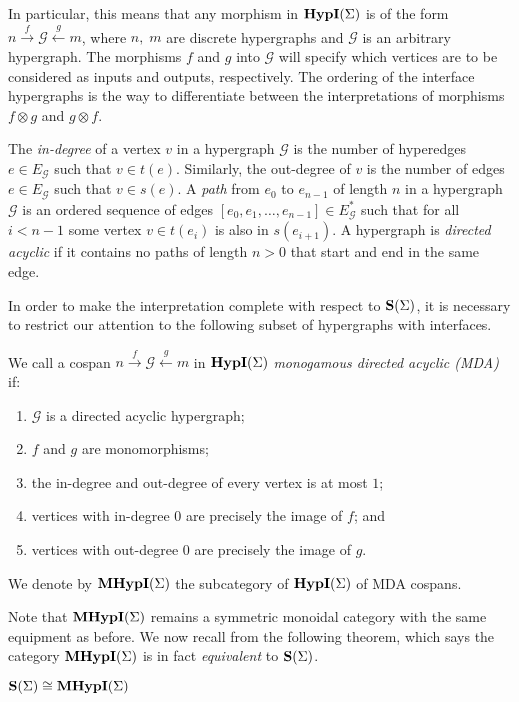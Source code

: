 In particular, this means that any morphism in $\textbf{HypI}(\Sigma)$ is of the form $n \xrightarrow{f} \mathcal{G} \xleftarrow{g} m$,
where $n,\;m$ are discrete hypergraphs and $\mathcal{G}$ is an arbitrary hypergraph.  The morphisms $f$ and $g$ into $\mathcal{G}$ will specify which vertices are to be considered as inputs and outputs,  respectively.
The ordering of the interface hypergraphs is the way to differentiate between the interpretations of morphisms $f \otimes g$ and $g \otimes f$.

\begin{definition} 
The \emph{in-degree} of a vertex $v$ in a hypergraph $\mathcal{G}$ is the number of hyperedges $e \in {E_\mathcal{G}}$ such that $v \in t(e)$.  
Similarly, the out-degree of $v$ is the number of edges $e \in E_\mathcal{G}$ such that $v \in s(e)$.
A \emph{path} from $e_0$ to $e_{n-1}$ of length $n$ in a hypergraph $\mathcal{G}$ is an ordered sequence of edges $[e_0, e_1, \ldots, e_{n-1}] \in E_\mathcal{G}^*$ such that for all $i < n - 1$ some vertex $v \in t(e_i)$ is also in $s(e_{i+1})$.
A hypergraph is \emph{directed acyclic} if it contains no paths of length $n > 0$ that start and end in the same edge.
\end{definition}

In order to make the interpretation complete with respect to $\mathbf{S}(\Sigma)$,  it is necessary to restrict our attention to the following subset of hypergraphs with interfaces. 
\begin{definition}
\label{def:monogamy_hyp}
We call a cospan $n \xrightarrow{f} \mathcal{G} \xleftarrow{g} m$ in $\textbf{HypI}(\Sigma)$ \emph{monogamous directed acyclic (MDA)} if:
\begin{enumerate}
    \item $\mathcal{G}$ is a directed acyclic hypergraph;
    \item $f$ and $g$ are monomorphisms;
    \item the in-degree and out-degree of every vertex is at most $1$;
    \item vertices with in-degree $0$ are precisely the image of $f$; and
    \item vertices with out-degree $0$ are precisely the image of $g$.
\end{enumerate}
We denote by $\textbf{MHypI}(\Sigma)$ the subcategory of $\textbf{HypI}(\Sigma)$ of MDA cospans.
\end{definition}
Note that $\textbf{MHypI}(\Sigma)$ remains a symmetric monoidal category with the same equipment as before.  We now recall from
\cite{bonchi_string_2022-2} the following theorem,  which says the category $\textbf{MHypI}(\Sigma)$ is in fact \textit{equivalent} to $\mathbf{S}(\Sigma)$. 
\begin{theorem}\label{thm:prop-equiv}
    $\mathbf{S}(\Sigma) \cong \textbf{MHypI}(\Sigma)$
\end{theorem}

